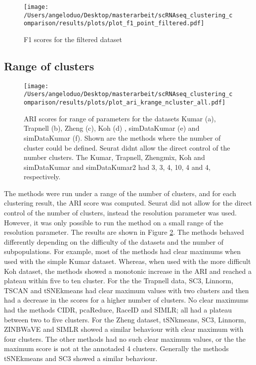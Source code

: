 \documentclass[12pt, a4paper]{article}\usepackage[]{graphicx}\usepackage[]{color}
\begin{document}
\begin{figure}[!h]
\texttt{[image: /Users/angeloduo/Desktop/masterarbeit/scRNAseq\_clustering\_comparison/results/plots/plot\_f1\_point\_filtered.pdf]}
\caption{F1 scores for the filtered  dataset }
\label{fig:f1pointplot}
\end{figure}


\subsection{Range of clusters}
\begin{figure}[!h]
\texttt{[image: /Users/angeloduo/Desktop/masterarbeit/scRNAseq\_clustering\_comparison/results/plots/plot\_ari\_krange\_ncluster\_all.pdf]}
\caption{ARI scores for range of parameters for the datasets Kumar (a), Trapnell (b), Zheng (c), Koh (d) , simDataKumar (e) and simDataKumar (f). Shown are the methods where the number of cluster could be defined. Seurat didnt allow the direct control of the number clusters. The Kumar, Trapnell, Zhengmix, Koh and simDataKumar and simDataKumar2 had 3, 3, 4, 10, 4 and 4, respectively.}
\label{fig:arirangeall}
\end{figure}

The methods were run under a range of the number of clusters, and for each clustering result, the ARI score was computed. Seurat did not allow for the direct control of the number of clusters, instead the resolution parameter was used. However, it was only possible to run the method on a small range of the resolution parameter.  The results are shown in Figure \ref{fig:arirangeall}. The methods behaved differently depending on the difficulty of the datasets and the number of subpopulations. For example, most of the methods had clear maximums when used with the simple Kumar dataset. Whereas, when used with the more difficult Koh dataset, the methods showed a monotonic increase in the ARI and reached a plateau within five to ten cluster. For the the Trapnell data, SC3, Linnorm, TSCAN and tSNEkmeans had clear maximum values with two clusters and then had a decrease in the scores for a higher number of clusters. No clear maximums had the methods CIDR, pcaReduce, RaceID and SIMLR; all had a plateau between two to five clusters. For the Zheng dataset, tSNkmeans, SC3, Linnorm, ZINBWaVE and SIMLR showed a similar behaviour with clear maximum with four clusters. The other methods had no such clear maximum values, or the the maximum score is not at the annotaded 4 clusters.
Generally the methods tSNEkmeans and SC3 showed a similar behaviour.
\end{document}
